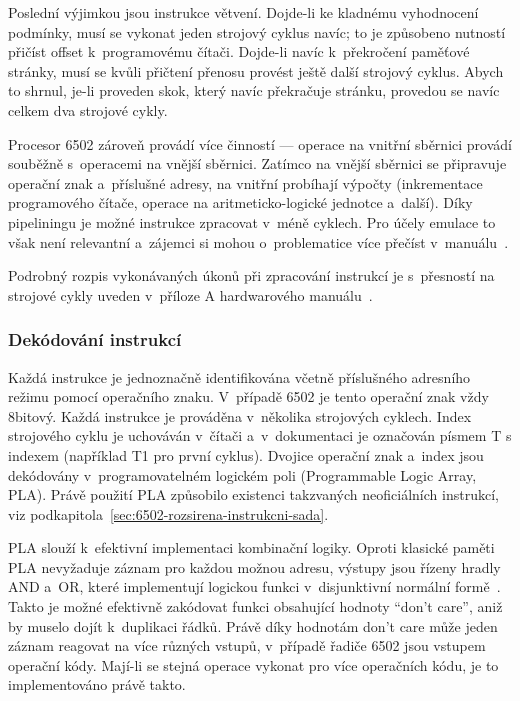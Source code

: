 Poslední výjimkou jsou instrukce větvení. Dojde-li ke kladnému vyhodnocení podmínky, musí se vykonat jeden strojový cyklus navíc; to je způsobeno nutností přičíst offset k~programovému čítači. Dojde-li navíc k~překročení paměťové stránky, musí se kvůli přičtení přenosu provést ještě další strojový cyklus. Abych to shrnul, je-li proveden skok, který navíc překračuje stránku, provedou se navíc celkem dva strojové cykly.

\begin{note}[6502 a pipelining]
	Procesor 6502 zároveň provádí více činností --- operace na vnitřní sběrnici provádí souběžně s~operacemi na vnější sběrnici. Zatímco na vnější sběrnici se připravuje operační znak a~příslušné adresy, na vnitřní probíhají výpočty (inkrementace programového čítače, operace na aritmeticko-logické jednotce a~další). Díky pipeliningu je možné instrukce zpracovat v~méně cyklech. Pro účely emulace to však není relevantní a~zájemci si mohou o~problematice více přečíst v~manuálu~.
\end{note}

Podrobný rozpis vykonávaných úkonů při zpracování instrukcí je s~přesností na strojové cykly uveden v~příloze A hardwarového manuálu~\cite{mos:hw-manual}.

\subsubsection{Dekódování instrukcí}
\label{sec:6502-dekodovani-instrukci}
Každá instrukce je jednoznačně identifikována včetně příslušného adresního režimu pomocí operačního znaku. V~případě 6502 je tento operační znak vždy 8bitový.  Každá instrukce je prováděna v~několika strojových cyklech.  Index strojového cyklu je uchováván v~čítači a~v~dokumentaci je označován písmem T s indexem (například T1 pro první cyklus). Dvojice operační znak a~index jsou dekódovány v~programovatelném logickém poli (Programmable Logic Array, PLA).  Právě použití PLA způsobilo existenci takzvaných neoficiálních instrukcí, viz podkapitola~\ref{sec:6502-rozsirena-instrukcni-sada}.

PLA slouží k~efektivní implementaci kombinační logiky.  Oproti klasické paměti PLA nevyžaduje záznam pro každou možnou adresu, výstupy jsou řízeny hradly AND a~OR, které implementují logickou funkci v~disjunktivní normální formě~\cite{Kambayashi1979:PLA}. Takto je možné efektivně zakódovat funkci obsahující hodnoty \enquote{don't care}, aniž by muselo dojít k~duplikaci řádků. Právě díky hodnotám don't care může jeden záznam reagovat na více různých vstupů, v~případě řadiče 6502 jsou vstupem operační kódy. Mají-li se stejná operace vykonat pro více operačních kódu, je to implementováno právě takto.

